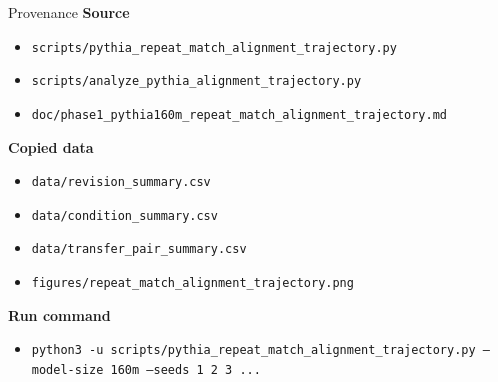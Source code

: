 \documentclass[aspectratio=169]{beamer}
\begin{document}
\begin{frame}{Provenance}
  \small
  \textbf{Source}
  \begin{itemize}
    \item \texttt{scripts/pythia\_repeat\_match\_alignment\_trajectory.py}
    \item \texttt{scripts/analyze\_pythia\_alignment\_trajectory.py}
    \item \texttt{doc/phase1\_pythia160m\_repeat\_match\_alignment\_trajectory.md}
  \end{itemize}

  \vspace{0.4em}
  \textbf{Copied data}
  \begin{itemize}
    \item \texttt{data/revision\_summary.csv}
    \item \texttt{data/condition\_summary.csv}
    \item \texttt{data/transfer\_pair\_summary.csv}
    \item \texttt{figures/repeat\_match\_alignment\_trajectory.png}
  \end{itemize}

  \vspace{0.4em}
  \textbf{Run command}
  \begin{itemize}
    \item \texttt{python3 -u scripts/pythia\_repeat\_match\_alignment\_trajectory.py --model-size 160m --seeds 1 2 3 ...}
  \end{itemize}
\end{frame}
\end{document}
